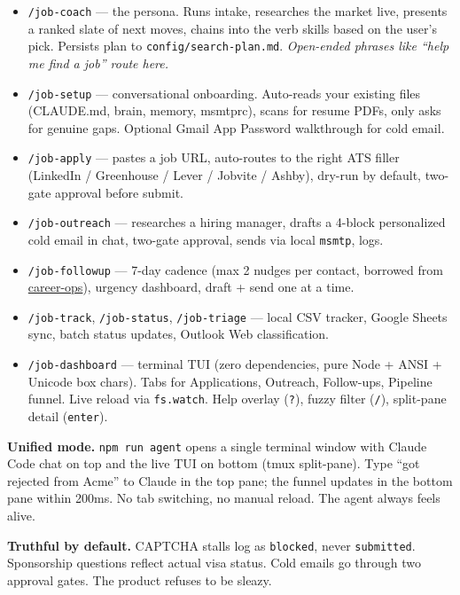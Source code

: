 \documentclass[11pt]{article}
\begin{document}
\begin{itemize}
  \item \texttt{/job-coach} --- the persona. Runs intake, researches the market live, presents a ranked slate of next moves, chains into the verb skills based on the user's pick. Persists plan to \texttt{config/search-plan.md}. \emph{Open-ended phrases like ``help me find a job'' route here.}
  \item \texttt{/job-setup} --- conversational onboarding. Auto-reads your existing files (CLAUDE.md, brain, memory, msmtprc), scans for resume PDFs, only asks for genuine gaps. Optional Gmail App Password walkthrough for cold email.
  \item \texttt{/job-apply} --- pastes a job URL, auto-routes to the right ATS filler (LinkedIn / Greenhouse / Lever / Jobvite / Ashby), dry-run by default, two-gate approval before submit.
  \item \texttt{/job-outreach} --- researches a hiring manager, drafts a 4-block personalized cold email in chat, two-gate approval, sends via local \texttt{msmtp}, logs.
  \item \texttt{/job-followup} --- 7-day cadence (max 2 nudges per contact, borrowed from \href{https://github.com/santifer/career-ops}{career-ops}), urgency dashboard, draft + send one at a time.
  \item \texttt{/job-track}, \texttt{/job-status}, \texttt{/job-triage} --- local CSV tracker, Google Sheets sync, batch status updates, Outlook Web classification.
  \item \texttt{/job-dashboard} --- terminal TUI (zero dependencies, pure Node + ANSI + Unicode box chars). Tabs for Applications, Outreach, Follow-ups, Pipeline funnel. Live reload via \texttt{fs.watch}. Help overlay (\texttt{?}), fuzzy filter (\texttt{/}), split-pane detail (\texttt{enter}).
\end{itemize}

\textbf{Unified mode.} \texttt{npm run agent} opens a single terminal window with Claude Code chat on top and the live TUI on bottom (tmux split-pane). Type ``got rejected from Acme'' to Claude in the top pane; the funnel updates in the bottom pane within 200ms. No tab switching, no manual reload. The agent always feels alive.

\textbf{Truthful by default.} CAPTCHA stalls log as \texttt{blocked}, never \texttt{submitted}. Sponsorship questions reflect actual visa status. Cold emails go through two approval gates. The product refuses to be sleazy.
\end{document}
